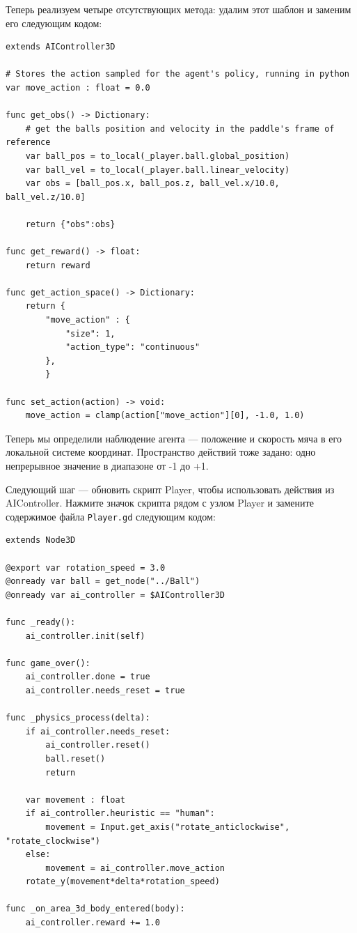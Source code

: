 \documentclass[11pt,a4paper]{article}
\begin{document}
Теперь реализуем четыре отсутствующих метода: удалим этот шаблон и заменим его следующим кодом:

\begin{lstlisting}
extends AIController3D

# Stores the action sampled for the agent's policy, running in python
var move_action : float = 0.0

func get_obs() -> Dictionary:
	# get the balls position and velocity in the paddle's frame of reference
	var ball_pos = to_local(_player.ball.global_position)
	var ball_vel = to_local(_player.ball.linear_velocity)
	var obs = [ball_pos.x, ball_pos.z, ball_vel.x/10.0, ball_vel.z/10.0]

	return {"obs":obs}

func get_reward() -> float:
	return reward

func get_action_space() -> Dictionary:
	return {
		"move_action" : {
			"size": 1,
			"action_type": "continuous"
		},
		}

func set_action(action) -> void:
	move_action = clamp(action["move_action"][0], -1.0, 1.0)
\end{lstlisting}

Теперь мы определили наблюдение агента --- положение и скорость мяча в его локальной системе координат. Пространство действий тоже задано: одно непрерывное значение в диапазоне от -1 до +1.

Следующий шаг --- обновить скрипт Player, чтобы использовать действия из AIController. Нажмите значок скрипта рядом с узлом Player и замените содержимое файла \texttt{Player.gd} следующим кодом:

\begin{lstlisting}
extends Node3D

@export var rotation_speed = 3.0
@onready var ball = get_node("../Ball")
@onready var ai_controller = $AIController3D

func _ready():
	ai_controller.init(self)

func game_over():
	ai_controller.done = true
	ai_controller.needs_reset = true

func _physics_process(delta):
	if ai_controller.needs_reset:
		ai_controller.reset()
		ball.reset()
		return

	var movement : float
	if ai_controller.heuristic == "human":
		movement = Input.get_axis("rotate_anticlockwise", "rotate_clockwise")
	else:
		movement = ai_controller.move_action
	rotate_y(movement*delta*rotation_speed)

func _on_area_3d_body_entered(body):
	ai_controller.reward += 1.0
\end{lstlisting}
\end{document}

